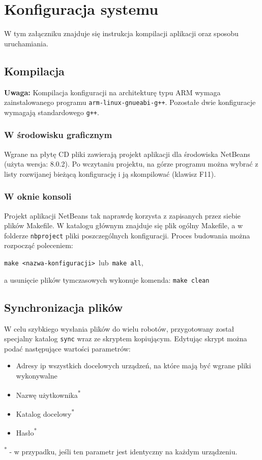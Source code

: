 \section{Konfiguracja systemu}
\label{ch:konfiguracja_systemu}

W tym załączniku znajduje się instrukcja kompilacji aplikacji oraz sposobu uruchamiania.

\subsection{Kompilacja}

\textbf{Uwaga:} Kompilacja konfiguracji na architekturę typu ARM wymaga zainstalowanego programu {\tt arm-linux-gnueabi-g++}. Pozostałe dwie konfiguracje wymagają standardowego {\tt g++}.

\subsubsection{W środowisku graficznym}

Wgrane na płytę CD pliki zawierają projekt aplikacji dla środowiska NetBeans (użyta wersja: 8.0.2). Po wczytaniu projektu, na górze programu można wybrać z\,listy rozwijanej bieżącą konfigurację i ją skompilować (klawisz F11).

\subsubsection{W oknie konsoli}

Projekt aplikacji NetBeans tak naprawdę korzysta z zapisanych przez siebie plików Makefile. W katalogu głównym znajduje się plik ogólny Makefile, a w folderze {\tt nbproject} pliki poszczególnych konfiguracji. Proces budowania można rozpocząć poleceniem:
\begin{center}
    {\tt make <nazwa-konfiguracji>}\  lub\
    {\tt make all},
\end{center}
a usunięcie plików tymczasowych wykonuje komenda: {\tt make clean}

\subsection{Synchronizacja plików}

W celu szybkiego wysłania plików do wielu robotów, przygotowany został specjalny katalog {\tt sync} wraz ze skryptem kopiującym. Edytując skrypt można podać następujące wartości parametrów:
\begin{itemize}
    \item Adresy ip wszystkich docelowych urządzeń, na które mają być wgrane pliki wykonywalne
    \item Nazwę użytkownika\textsuperscript{*}
    \item Katalog docelowy\textsuperscript{*}
    \item Hasło\textsuperscript{*}
\end{itemize}
\textsuperscript{*} - w przypadku, jeśli ten parametr jest identyczny na każdym urządzeniu.

